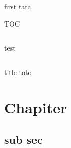 \documentclass{beamer}
\begin{document}

   \begin{frame}{first}
      tata
   \end{frame}

{

	\begin{frame}{TOC}
      \begin{columns}
			test
			\tableofcontents
		\end{columns}
	\end{frame}

	\begin{frame}{title}
		toto
	\end{frame}
} 
 
\section{Chapiter}
\subsection{sub sec}
\end{document}
